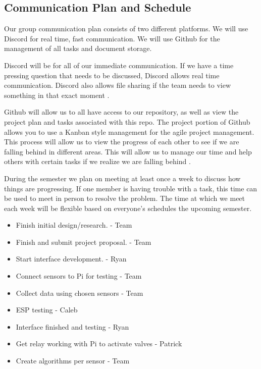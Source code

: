\documentclass[letterpaper, 10 pt, conference]{ieeeconf}  %
\begin{document}
\subsection{Communication Plan and Schedule}
Our group communication plan consists of two different platforms. We will use Discord for real time, fast communication. We will use Github for the management of all tasks and document storage. 

Discord will be for all of our immediate communication. If we have a time pressing question that needs to be discussed, Discord allows real time communication. Discord also allows file sharing if the team needs to view something in that exact moment \cite{discord}.

Github will allow us to all have access to our repository, as well as view the project plan and tasks associated with this repo. The project portion of Github allows you to use a Kanban style management for the agile project management. This process will allow us to view the progress of each other to see if we are falling behind in different areas. This will allow us to manage our time and help others with certain tasks if we realize we are falling behind \cite{github}. 

During the semester we plan on meeting at least once a week to discuss how things are progressing. If one member is having trouble with a task, this time can be used to meet in person to resolve the problem. The time at which we meet each week will be flexible based on everyone's schedules the upcoming semester.

\begin{itemize}
    \item Finish initial design/research. - Team
    \item Finish and submit project proposal. - Team
    \item Start interface development. - Ryan
\end{itemize}

\begin{itemize}
    \item Connect sensors to Pi for testing - Team
    \item Collect data using chosen sensors - Team
    \item ESP testing - Caleb
\end{itemize}

\begin{itemize}
    \item Interface finished and testing - Ryan
    \item Get relay working with Pi to activate valves - Patrick
    \item Create algorithms per sensor - Team
\end{itemize}
\end{document}
